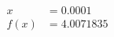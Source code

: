 \documentclass[preview]{standalone}
\begin{document}
\begin{align*}
x &= 0.0001\\f(x) &= 4.0071835
\end{align*}
\end{document}

